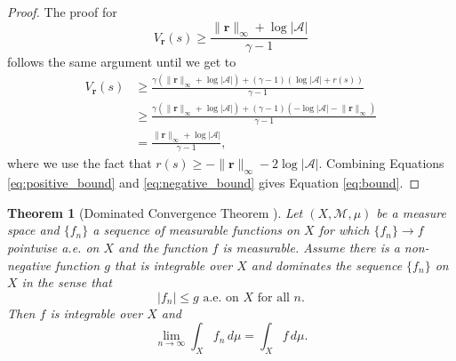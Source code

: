 \documentclass{mpaper}
\newtheorem{theorem}{Theorem}[section]
\newcommand{\V}{V_{\mathbf{r}}}
\newcommand{\rinf}{\lVert \mathbf{r} \rVert_\infty}
\begin{document}
\begin{proof}
  The proof for
  \begin{equation} \label{eq:negative_bound}
    \V(s) \ge \frac{\rinf + \log|\mathcal{A}|}{\gamma - 1}
  \end{equation}
  follows the same argument until we get to
  \begin{align*}
    \V(s) &\ge \frac{\gamma(\rinf + \log|\mathcal{A}|) + (\gamma - 1)(\log|\mathcal{A}| + r(s))}{\gamma - 1} \\
          &\ge \frac{\gamma(\rinf + \log|\mathcal{A}|) + (\gamma - 1)(-\log|\mathcal{A}| -\rinf)}{\gamma - 1} \\
          &= \frac{\rinf + \log|\mathcal{A}|}{\gamma - 1},
  \end{align*}
  where we use the fact that $r(s) \ge -\rinf - 2\log|\mathcal{A}|$. Combining
  Equations \ref{eq:positive_bound} and \ref{eq:negative_bound} gives
  Equation \ref{eq:bound}.
\end{proof}

\begin{theorem}[Dominated Convergence Theorem
  \cite{royden2010real}] \label{thm:lebesgue}
  Let $(X, \mathcal{M}, \mu)$ be a measure space and $\{ f_n \}$ a sequence of
  measurable functions on $X$ for which $\{ f_n \} \to f$ pointwise a.e. on $X$
  and the function $f$ is measurable. Assume there is a non-negative function
  $g$ that is integrable over $X$ and dominates the sequence $\{ f_n \}$ on $X$
  in the sense that
  \[
    |f_n| \le g \text{ a.e. on $X$ for all $n$.}
  \]
  Then $f$ is integrable over $X$ and
  \[
    \lim_{n \to \infty} \int_X f_n\,d\mu = \int_X f\,d\mu.
  \]
\end{theorem}
\end{document}
